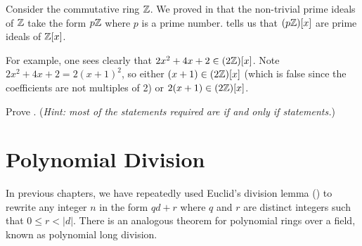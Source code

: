 \begin{example}
    Consider the commutative ring $\mathbb{Z}$. We proved in  that the non-trivial prime ideals of $\mathbb{Z}$ take the form $p\mathbb{Z}$ where $p$ is a prime number.  tells us that $(p\mathbb{Z})[x]$ are prime ideals of $\mathbb{Z}[x]$.

    For example, one sees clearly that $2x^2 + 4x + 2 \in (2\mathbb{Z})[x]$. Note $2x^2 + 4x + 2 = 2(x+1)^2$, so either $(x+1) \in (2\mathbb{Z})[x]$ (which is false since the coefficients are not multiples of 2) or $2(x+1) \in (2\mathbb{Z})[x]$.
\end{example}

\begin{exercise}\label{exercise-prime-ideal-iff-prime-ideal-in-polynomial-ring}
    Prove .\newline
    (\textit{Hint: most of the statements required are if and only if statements.})
\end{exercise}

\section{Polynomial Division}
In previous chapters, we have repeatedly used Euclid's division lemma () to rewrite any integer $n$ in the form $qd + r$ where $q$ and $r$ are distinct integers such that $0 \leq r < |d|$. There is an analogous theorem for polynomial rings over a field, known as polynomial long division.

